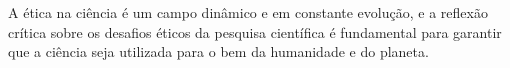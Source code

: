 \documentclass{article} %
\begin{document}
A ética na ciência é um campo dinâmico e em constante evolução, e a reflexão crítica sobre os desafios éticos da pesquisa científica é fundamental para garantir que a ciência seja utilizada para o bem da humanidade e do planeta.








 
\end{document}
